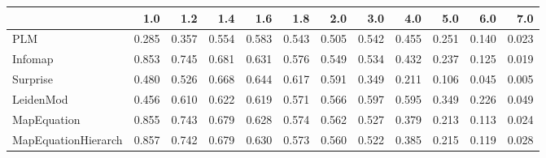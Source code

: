 \begin{tabular}{lrrrrrrrrrrr}
\toprule
{} &   1.0 &   1.2 &   1.4 &   1.6 &   1.8 &   2.0 &   3.0 &   4.0 &   5.0 &   6.0 &   7.0 \\
\midrule
PLM                 & 0.285 & 0.357 & 0.554 & 0.583 & 0.543 & 0.505 & 0.542 & 0.455 & 0.251 & 0.140 & 0.023 \\
Infomap             & 0.853 & 0.745 & 0.681 & 0.631 & 0.576 & 0.549 & 0.534 & 0.432 & 0.237 & 0.125 & 0.019 \\
Surprise            & 0.480 & 0.526 & 0.668 & 0.644 & 0.617 & 0.591 & 0.349 & 0.211 & 0.106 & 0.045 & 0.005 \\
LeidenMod           & 0.456 & 0.610 & 0.622 & 0.619 & 0.571 & 0.566 & 0.597 & 0.595 & 0.349 & 0.226 & 0.049 \\
MapEquation         & 0.855 & 0.743 & 0.679 & 0.628 & 0.574 & 0.562 & 0.527 & 0.379 & 0.213 & 0.113 & 0.024 \\
MapEquationHierarch & 0.857 & 0.742 & 0.679 & 0.630 & 0.573 & 0.560 & 0.522 & 0.385 & 0.215 & 0.119 & 0.028 \\
\bottomrule
\end{tabular}
